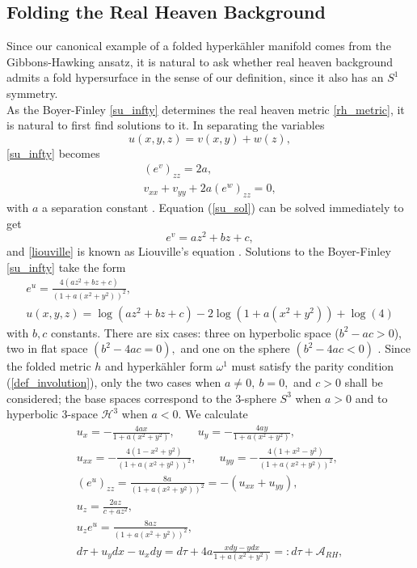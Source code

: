 \documentclass[a4paper,12pt, onecolumn, notitlepage]{article}
\theoremstyle{definition}
\theoremstyle{remark}
\newcommand{\w}{\omega}
\newcommand{\HK}{hyperk\"ahler }
\begin{document}
\subsection{Folding the Real Heaven Background}
Since our canonical example of a folded \HK manifold comes from the Gibbons-Hawking ansatz, it is natural to ask whether real heaven background admits a fold hypersurface in the sense of our definition, since it also has an $S^{1}$ symmetry.\\
As the Boyer-Finley \cref{su_infty} determines the real heaven metric \cref{rh_metric}, it is natural to first find solutions to it. In separating the variables
\begin{equation*}
	u(x,y,z) = v(x,y) + w(z),
\end{equation*}
\cref{su_infty} becomes
\begin{subequations}
	\begin{gather}
	\label{su_sol}
	(e^{v})_{zz} = 2a,\\
	\label{liouville}
	v_{xx} + v_{yy} + 2a(e^{w})_{zz}=0,
	\end{gather}
\end{subequations}
with $a$ a separation constant \cite{tod_1995}. Equation (\ref{su_sol}) can be solved immediately to get
\begin{equation}
	e^{v} = az^{2} + bz + c,
\end{equation}
and \cref{liouville} is known as Liouville's equation \cite{tod_1995}. Solutions to the Boyer-Finley \cref{su_infty} take the form
\begin{gather*}
	e^{u}=\frac{4(az^{2}+bz+c)}{(1+a(x^{2}+y^{2}))^{2}},\\
	u(x,y,z) = \log(az^{2}+bz+c)-2\log(1+a(x^{2}+y^{2})) +\log(4)
\end{gather*}
with $b,c$ constants. There are six cases: three on hyperbolic space ($b^{2}-ac>0$), two in flat space $(b^{2}-4ac=0),$ and one on the sphere $(b^{2}-4ac<0)$ \cite{tod_1995}. Since the folded metric $h$ and \HK form $\w^{1}$ must satisfy the parity condition (\ref{def_involution}), only the two cases when $a\neq 0,\ b=0,$ and $c>0$ shall be considered; the base spaces correspond to the 3-sphere $S^{3}$ when $a>0$ and to hyperbolic 3-space $\mathcal{H}^{3}$ when $a<0.$ We calculate
\begin{subequations}
	\begin{gather*}
	u_{x} = -\frac{4ax}{1+a(x^{2} + y^{2})}, \qquad u_{y} = -\frac{4ay}{1+a(x^{2} + y^{2})},\\
	u_{xx} = -\frac{4(1-x^{2}+y^{2})}{(1+a(x^{2} + y^{2}))^{2}},\qquad u_{yy} = -\frac{4(1+x^{2}-y^{2})}{(1+a(x^{2} + y^{2}))^{2}},\\
	(e^{u})_{zz} = \frac{8a}{(1+a(x^{2} + y^{2}))^{2}} = -(u_{xx} + u_{yy}),\\
	u_{z} = \frac{2az}{c+az^{2}},\\
	u_{z}e^{u} = \frac{8az}{(1+a(x^{2} + y^{2}))^{2}},\\
	d\tau + u_{y}dx-u_{x}dy = d\tau + 4a\frac{xdy-ydx}{1+a(x^{2} + y^{2})} =: d\tau + \mathcal{A}_{RH},
	\end{gather*}
\end{subequations}
\end{document}
